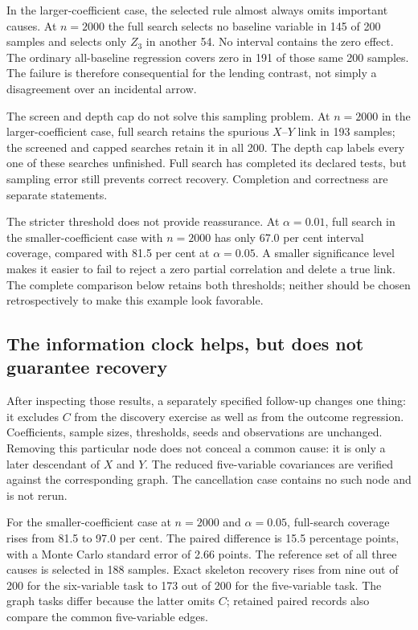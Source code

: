 In the larger-coefficient case, the selected rule almost always omits important
causes. At $n=2000$ the full search selects no baseline variable in 145 of 200
samples and selects only $Z_3$ in another 54. No interval contains the zero
effect. The ordinary all-baseline regression covers zero in 191 of those same
200 samples. The failure is therefore consequential for the lending contrast,
not simply a disagreement over an incidental arrow.

The screen and depth cap do not solve this sampling problem. At $n=2000$ in
the larger-coefficient case, full search retains the spurious $X$--$Y$ link in
193 samples; the screened and capped searches retain it in all 200. The depth
cap labels every one of these searches unfinished. Full search has completed
its declared tests, but sampling error still prevents correct recovery.
Completion and correctness are separate statements.

The stricter threshold does not provide reassurance. At $\alpha=0.01$, full
search in the smaller-coefficient case with $n=2000$ has only 67.0 per cent
interval coverage, compared with 81.5 per cent at $\alpha=0.05$. A smaller
significance level makes it easier to fail to reject a zero partial correlation and
delete a true link. The complete comparison below retains both thresholds;
neither should be chosen retrospectively to make this example look favorable.

\subsection{The information clock helps, but does not guarantee recovery}

After inspecting those results, a separately specified follow-up changes one
thing: it excludes $C$ from the discovery exercise as well as from the outcome
regression. Coefficients, sample sizes, thresholds, seeds and observations are
unchanged. Removing this particular node does not conceal a common cause:
it is only a later descendant of $X$ and $Y$. The reduced five-variable
covariances are verified against the corresponding graph. The cancellation
case contains no such node and is not rerun.

For the smaller-coefficient case at $n=2000$ and $\alpha=0.05$, full-search
coverage rises from 81.5 to 97.0 per cent. The paired difference is 15.5
percentage points, with a Monte Carlo standard error of 2.66 points. The
reference set of all three causes is selected in 188 samples. Exact skeleton
recovery rises from nine out of 200 for the six-variable task to 173 out of
200 for the five-variable task. The graph tasks differ because the latter
omits $C$; retained paired records also compare the common five-variable edges.


